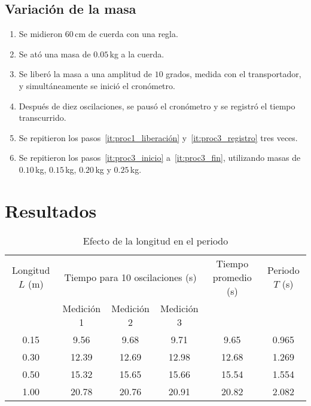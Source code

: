 \documentclass[twocolumn]{article}
\numberwithin{table}{section}
\begin{document}
\subsection{Variación de la masa}

\begin{enumerate}
  \item Se midieron 60\,cm de cuerda con una regla.\label{it:proc3_inicio}
  \item Se ató una masa de $0.05$\,kg a la cuerda.
  \item Se liberó la masa a una amplitud de $10$ grados, medida con
    el transportador, y simultáneamente se inició el
    cronómetro.
  \item Después de diez oscilaciones, se pausó el cronómetro y se
    registró el tiempo transcurrido.\label{it:proc3_registro}
  \item Se repitieron los pasos~\ref{it:proc1_liberación}
    y~\ref{it:proc3_registro} tres veces.\label{it:proc3_fin}
  \item Se repitieron los pasos~\ref{it:proc3_inicio}
    a~\ref{it:proc3_fin}, utilizando masas de
    $0.10$\,kg, $0.15$\,kg, $0.20$\,kg y $0.25$\,kg.
\end{enumerate}

\newpage
\onecolumn
\section{Resultados}

\begin{table}[ht]
  \centering
  \caption{Efecto de la longitud en el periodo}\label{tab:longitud_periodo}
  \begin{tabular}{cccccc}
    \toprule
    Longitud $L$ (m) & \multicolumn{3}{c}{Tiempo para 10
    oscilaciones (s)} & Tiempo promedio (s) & Periodo $T$ (s) \\
    \cmidrule(lr){2-4}
    & Medición 1 & Medición 2 & Medición 3 &  &  \\
    \midrule
    0.15 &  9.56 &  9.68 &  9.71 &  9.65 & 0.965 \\
    0.30 & 12.39 & 12.69 & 12.98 & 12.68 & 1.269 \\
    0.50 & 15.32 & 15.65 & 15.66 & 15.54 & 1.554 \\
    1.00 & 20.78 & 20.76 & 20.91 & 20.82 & 2.082 \\
    \bottomrule
  \end{tabular}
\end{table}
\end{document}
